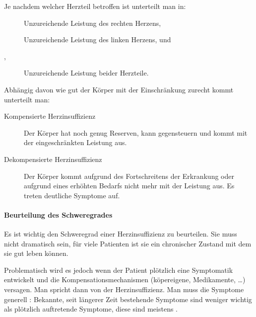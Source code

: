 Je nachdem welcher Herzteil betroffen ist unterteilt man in:

\begin{description}
	\item[] Unzureichende Leistung des rechten Herzens, 
	\item[]
	 Unzureichende Leistung des linken Herzens, und
	\item[,] Unzureichende Leistung beider Herzteile.  
\end{description}

Abhängig davon wie gut der Körper mit der Einschränkung zurecht kommt unterteilt man: 

\begin{description}
    \item[Kompensierte Herzinsuffizienz] Der Körper hat noch
    genug Reserven, kann gegensteuern und kommt mit der
    eingeschränkten Leistung aus. 
    \item[Dekompensierte Herzinsuffizienz] Der Körper kommt aufgrund des
    Fortschreitens der Erkrankung oder aufgrund eines erhöhten
    Bedarfs nicht mehr mit der Leistung aus. Es treten deutliche
    Symptome auf.
\end{description}

\paragraph{Beurteilung des Schweregrades}

Es ist wichtig den Schweregrad einer Herzinsuffizienz zu beurteilen. Sie
muss nicht dramatisch sein, für viele Patienten ist sie ein
chronischer Zustand mit dem sie gut leben können.

Problematisch wird es jedoch wenn der Patient plötzlich eine Symptomatik entwickelt und
die Kompensationsmechanismen (köpereigene, Medikamente, {\dots})
versagen. Man spricht dann von der 
Herzinsuffizienz. Man muss die Symptome generell : Bekannte, seit längerer Zeit bestehende
Symptome sind weniger wichtig als plötzlich auftretende
Symptome, diese sind meistens . 




